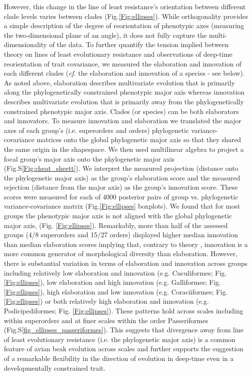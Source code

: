 \documentclass[12pt,letterpaper]{article}
\begin{document}
However, this change in the line of least resistance's orientation between different clade levels varies between clades (Fig.\ref{Fig:ellipses}).
While orthogonality provides a simple description of the degree of reorientation of phenotypic axes (measuring the two-dimensional plane of an angle), it does not fully capture the multi-dimensionality of the data.
To further quantify the tension implied between theory on lines of least evolutionary resistance and observations of deep-time reorientation of trait covariance, we measured the elaboration and innovation of each different clades (\textit{cf.} the elaboration and innovation of a species - see below).
As noted above, elaboration describes multivariate evolution that is primarily along the phylogenetically constrained phenotypic major axis whereas innovation describes multivariate evolution that is primarily away from the phylogenetically constrained phenotypic major axis.
Clades (or species) can be both elaborators and innovators.
To measure innovation and elaboration we translated the major axes of each group's (i.e. superorders and orders) phylogenetic variance-covariance matrices onto the global phylogenetic major axis so that they shared the same origin in the shapespace.
We then used multilinear algebra to project a focal group's major axis onto the phylogenetic major axis (Fig.S\ref{Fig:cheat_sheett}).
We interpret the measured projection (distance onto the phylogenetic major axis) as the group's elaboration score and the measured rejection (distance from the major axis) as the group's innovation score.
These scores were measured for each of 4000 posterior pairs of group vs. phylogenetic variance-covariance matrix (Fig.\ref{Fig:ellipses} boxplots).
We found that for most groups the phenotypic major axis is not aligned with the global phylogenetic major axis, (Fig. \ref{Fig:ellipses}).
Remarkably, more than half of the assessed groups (4/8 superorders and 15/27 orders) displayed higher median innovation than median elaboration scores implying that, contrary to theory \cite{schluter1996adaptive,marroig2005size}, innovation is a more common generator of morphological diversity than elaboration.
However, there is substantial variation in terms of elaboration and innovation across groups including relatively low elaboration and innovation (e.g. Cuculiformes; Fig. \ref{Fig:ellipses}), low elaboration and high innovation (e.g. Galliformes; Fig. \ref{Fig:ellipses}), high elaboration and low innovation (e.g. Coraciiformes; Fig. \ref{Fig:ellipses}) or both relatively high elaboration and innovation (e.g. Podicipediformes; Fig. \ref{Fig:ellipses}).
These patterns hold across scales including within superorders and at finer scales within the order Passeriformes (Fig.S\ref{fig_ellipses_passeriformes}).
This suggests that divergence away from line of least evolutionary resistance (i.e. the phylogenetic major axis) is a common feature of avian beak evolution across scales and further supports the suggestion of a remarkable flexibility in the direction of evolution in deep-time even in a developmentally constrained trait.
\end{document}
